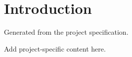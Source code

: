\section{Introduction}
Generated from the project specification.

Add project-specific content here.
